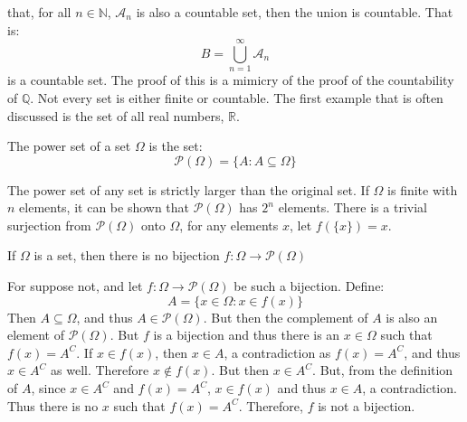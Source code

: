 \documentclass[crop=false,class=book,oneside]{standalone}
\begin{document}
            that, for all $n\in\mathbb{N}$, $\mathcal{A}_{n}$ is
            also a countable set, then the union is countable. That is:
            \begin{equation}
                B=\bigcup_{n=1}^{\infty}\mathcal{A}_{n}
            \end{equation}
            is a countable set. The proof of this is a mimicry of
            the proof of the countability of $\mathbb{Q}$. Not
            every set is either finite or countable. The first
            example that is often discussed is the set of all
            real numbers, $\mathbb{R}$.
            \begin{definition}
                The power set of a set $\Omega$ is the set:
                \begin{equation}
                    \mathcal{P}(\Omega)=
                    \{A:A\subseteq\Omega\}
                \end{equation}
            \end{definition}
            The power set of any set is strictly larger than the
            original set. If $\Omega$ is finite with $n$ elements, it
            can be shown that $\mathcal{P}(\Omega)$ has $2^{n}$
            elements. There is a trivial surjection from
            $\mathcal{P}(\Omega)$ onto $\Omega$, for any elements
            $x$, let $f(\{x\})=x$.
            \begin{theorem}
                If $\Omega$ is a set, then there is no bijection
                $f:\Omega\rightarrow\mathcal{P}(\Omega)$
            \end{theorem}
            \begin{bproof}
                For suppose not, and let
                $f:\Omega\rightarrow\mathcal{P}(\Omega)$ be such a
                bijection. Define:
                \begin{equation}
                    A=\{x\in\Omega:x\in{f}(x)\}
                \end{equation}
                Then $A\subseteq\Omega$, and thus
                $A\in\mathcal{P}(\Omega)$. But then the complement of
                $A$ is also an element of $\mathcal{P}(\Omega)$. But
                $f$ is a bijection and thus there is an $x\in\Omega$
                such that $f(x)=A^{C}$. If $x\in{f}(x)$, then
                $x\in{A}$, a contradiction as $f(x)=A^{C}$, and thus
                $x\in{A}^{C}$ as well. Therefore $x\notin{f}(x)$. But
                then $x\in{A}^{C}$. But, from the definition of $A$,
                since $x\in{A}^{C}$ and $f(x)=A^{C}$, $x\in{f}(x)$
                and thus $x\in{A}$, a contradiction. Thus there is no
                $x$ such that $f(x)=A^{C}$. Therefore, $f$ is not a
                bijection.
            \end{bproof}
\end{document}
